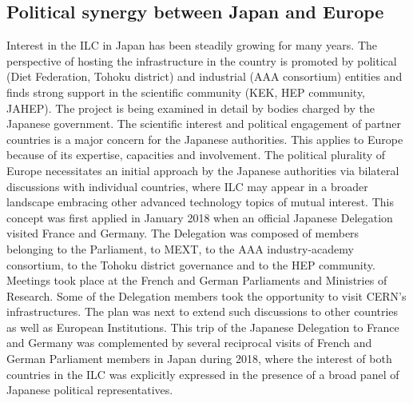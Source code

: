 \documentclass[%
 reprint,
 floatfix,
 amsmath,amssymb,
 aps,
]{revtex4-1}
\begin{document}
\subsection{\label{sec:discussionPol}Political synergy between Japan and Europe}
Interest in the ILC in Japan has been steadily growing for many years. The perspective of hosting the infrastructure in the country is promoted by political (Diet Federation, Tohoku district)
and industrial (AAA consortium) entities and finds strong support in the scientific community (KEK,
HEP community, JAHEP). The project is being examined in detail by bodies charged by the Japanese government. The scientific interest and political
engagement of partner countries is a major concern for the Japanese authorities. This
applies  to Europe because of its expertise, capacities and involvement.
The political plurality of Europe necessitates an initial approach by the Japanese
authorities via bilateral discussions with individual countries, where ILC may appear in a broader
landscape embracing other advanced technology topics of mutual interest. This concept was first applied
in January 2018 when an official Japanese Delegation visited France and Germany. The Delegation
was composed of members belonging to the Parliament, to MEXT, to the AAA industry-academy
consortium, to the Tohoku district governance and to the HEP community. Meetings took place at
the French and German Parliaments and Ministries of Research. Some of the Delegation members took the opportunity
to visit CERN's infrastructures. The plan was next to extend such discussions to other countries as well as European
Institutions. This trip of the Japanese Delegation to France and Germany was complemented by several reciprocal
visits of French and German Parliament members in Japan during 2018, where the interest of
both countries in the ILC was explicitly expressed in the presence of a broad panel of Japanese political
representatives. 

\end{document}
